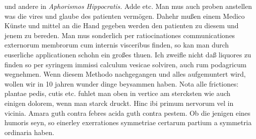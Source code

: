 %
und andere in \textit{Aphorismos Hippocratis.}\protect{}
Adde 
%
etc.
\pend%
\pstart%
Man mus auch proben anstellen was die vires
und glaube des patienten\protect{} verm\"{o}gen.
Dahehr mu{\ss}en einem Medico\protect{} K\"{u}nste und mittel an die Hand gegeben werden den patienten\protect{} zu diesem und jenem zu bereden.%
\pend%
\pstart%
Man mus sonderlich per ratiocinationes communicationes externorum membrorum\protect{} cum internis visceribus\protect{} finden, so kan man durch euserliche applicationen schohn ein gro{\ss}es thuen.
\pend%
\pstart%
Ich zweifle nicht da{\ss} liquores\protect{} zu finden so per syringem\protect{} immissi calculum vesicae\protect{} solviren\protect{}, auch rum\protect{} podagricum wegnehmen. Wenn diesem Methodo nachgegangen und alles aufgemuntert wird, wollen wir in 10 jahren wunder dinge beysammen haben.
\pend%
\pstart%
Nota alle frictiones: plantae pedis\protect{}, cutis\protect{} etc. fuhlet man oben in vertice am stercksten wie auch einigen dolorem\protect{}, wenn man starck druckt. Hinc ibi primum nervorum vel in vicinia.
\pend%
\pstart%
Amara\protect{} guth contra febres\protect{}
\pend%
\pstart%
acida\protect{} guth contra pestem\protect{}.
\pend%
\pstart%
Ob die jenigen eines humoris\protect{} seyn, so einerley exerrationes symmetriae certarum partium a symmetria ordinaria haben.
